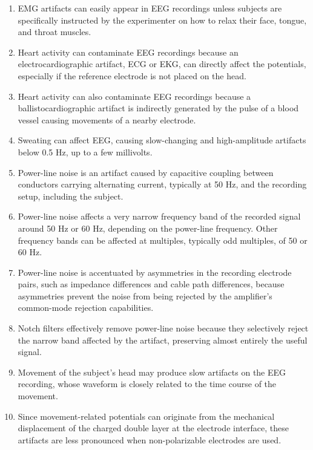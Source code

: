 \begin{enumerate}[label=\arabic*.]
    \item EMG artifacts can easily appear in EEG recordings unless subjects are specifically instructed by the experimenter on how to relax their face, tongue, and throat muscles.
    
    \item Heart activity can contaminate EEG recordings because an electrocardiographic artifact, ECG or EKG, can directly affect the potentials, especially if the reference electrode is not placed on the head.
    
    \item Heart activity can also contaminate EEG recordings because a ballistocardiographic artifact is indirectly generated by the pulse of a blood vessel causing movements of a nearby electrode.
    
    \item Sweating can affect EEG, causing slow-changing and high-amplitude artifacts below 0.5 Hz, up to a few millivolts.
    
    \item Power-line noise is an artifact caused by capacitive coupling between conductors carrying alternating current, typically at 50 Hz, and the recording setup, including the subject.
    
    \item Power-line noise affects a very narrow frequency band of the recorded signal around 50 Hz or 60 Hz, depending on the power-line frequency. Other frequency bands can be affected at multiples, typically odd multiples, of 50 or 60 Hz.
    
    \item Power-line noise is accentuated by asymmetries in the recording electrode pairs, such as impedance differences and cable path differences, because asymmetries prevent the noise from being rejected by the amplifier's common-mode rejection capabilities.
    
    \item Notch filters effectively remove power-line noise because they selectively reject the narrow band affected by the artifact, preserving almost entirely the useful signal.
    
    \item Movement of the subject's head may produce slow artifacts on the EEG recording, whose waveform is closely related to the time course of the movement.
    
    \item Since movement-related potentials can originate from the mechanical displacement of the charged double layer at the electrode interface, these artifacts are less pronounced when non-polarizable electrodes are used.
\end{enumerate}

